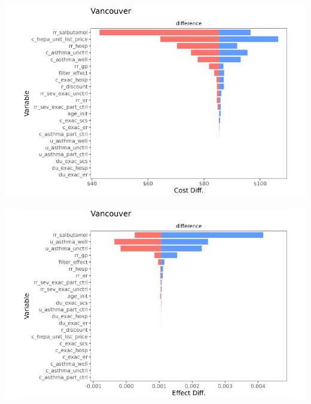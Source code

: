 \documentclass[
  number]{elsarticle}
\begin{document}
\includegraphics{index_files/figure-pdf/unnamed-chunk-9-31.pdf}

\includegraphics{index_files/figure-pdf/unnamed-chunk-9-32.pdf}
\end{document}
